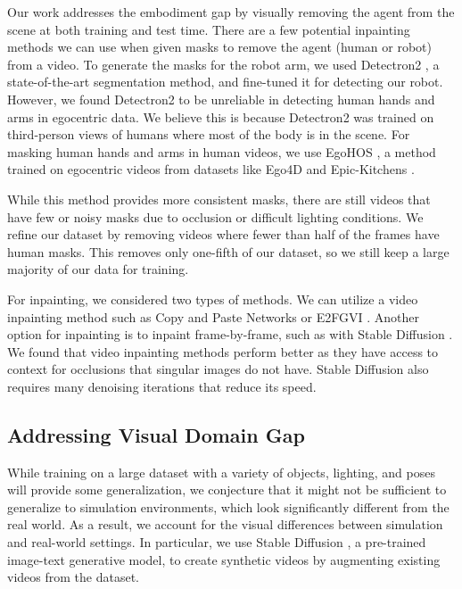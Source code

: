 Our work addresses the embodiment gap by visually removing the agent from the scene at both training and test time. There are a few potential inpainting methods we can use when given masks to remove the agent (human or robot) from a video. To generate the masks for the robot arm, we used Detectron2 \cite{detectron2}, a state-of-the-art segmentation method, and fine-tuned it for detecting our robot. However, we found Detectron2 to be unreliable in detecting human hands and arms in egocentric data. We believe this is because Detectron2 was trained on third-person views of humans where most of the body is in the scene. For masking human hands and arms in human videos, we use EgoHOS \cite{egohos}, a method trained on egocentric videos from datasets like Ego4D \cite{ego4d} and Epic-Kitchens \cite{epickitchens}. 

While this method provides more consistent masks, there are still videos that have few or noisy masks due to occlusion or difficult lighting conditions. We refine our dataset by removing videos where fewer than half of the frames have human masks. This removes only one-fifth of our dataset, so we still keep a large majority of our data for training.

For inpainting, we considered two types of methods. We can utilize a video inpainting method such as Copy and Paste Networks \cite{cpnetworks} or E2FGVI \cite{e2fgvi}. Another option for inpainting is to inpaint frame-by-frame, such as with Stable Diffusion \cite{stablediffusion}. We found that video inpainting methods perform better as they have access to context for occlusions that singular images do not have. Stable Diffusion also requires many denoising iterations that reduce its speed.

\subsection{Addressing Visual Domain Gap}

While training on a large dataset with a variety of objects, lighting, and poses will provide some generalization, we conjecture that it might not be sufficient to generalize to simulation environments, which look significantly different from the real world. As a result, we account for the visual differences between simulation and real-world settings. In particular, we use Stable Diffusion \cite{stablediffusion}, a pre-trained image-text generative model, to create synthetic videos by augmenting existing videos from the dataset.

